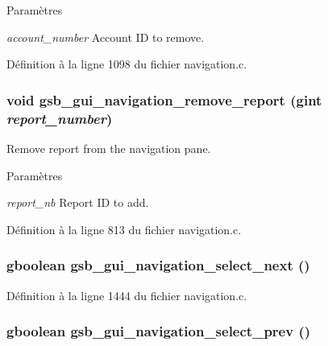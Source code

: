 \begin{DoxyParams}{Paramètres}
\item[{\em account\_\-number}]Account ID to remove. \end{DoxyParams}


Définition à la ligne 1098 du fichier navigation.c.

\subsubsection[{gsb\_\-gui\_\-navigation\_\-remove\_\-report}]{\setlength{\rightskip}{0pt plus 5cm}void gsb\_\-gui\_\-navigation\_\-remove\_\-report (gint {\em report\_\-number})}\label{navigation_8h_a8a6328e785b95ea6e2ee4163e6c71edc}
Remove report from the navigation pane.


\begin{DoxyParams}{Paramètres}
\item[{\em report\_\-nb}]Report ID to add. \end{DoxyParams}


Définition à la ligne 813 du fichier navigation.c.

\subsubsection[{gsb\_\-gui\_\-navigation\_\-select\_\-next}]{\setlength{\rightskip}{0pt plus 5cm}gboolean gsb\_\-gui\_\-navigation\_\-select\_\-next ()}\label{navigation_8h_a90ca4d003b85ca3c49ed7a7188a6ab60}


Définition à la ligne 1444 du fichier navigation.c.

\subsubsection[{gsb\_\-gui\_\-navigation\_\-select\_\-prev}]{\setlength{\rightskip}{0pt plus 5cm}gboolean gsb\_\-gui\_\-navigation\_\-select\_\-prev ()}\label{navigation_8h_af59677879274f3120ba149db61d4cb0e}


